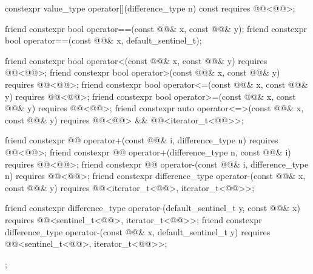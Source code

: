 \begin{codeblock}
{{    constexpr value_type operator[](difference_type n) const
      requires @@<@@>;

    friend constexpr bool operator==(const @@& x, const @@& y);
    friend constexpr bool operator==(const @@& x, default_sentinel_t);

    friend constexpr bool operator<(const @@& x, const @@& y)
      requires @@<@@>;
    friend constexpr bool operator>(const @@& x, const @@& y)
      requires @@<@@>;
    friend constexpr bool operator<=(const @@& x, const @@& y)
      requires @@<@@>;
    friend constexpr bool operator>=(const @@& x, const @@& y)
      requires @@<@@>;
    friend constexpr auto operator<=>(const @@& x, const @@& y)
      requires @@<@@> &&
               @@<iterator_t<@@>>;

    friend constexpr @@ operator+(const @@& i, difference_type n)
      requires @@<@@>;
    friend constexpr @@ operator+(difference_type n, const @@& i)
      requires @@<@@>;
    friend constexpr @@ operator-(const @@& i, difference_type n)
      requires @@<@@>;
    friend constexpr difference_type operator-(const @@& x, const @@& y)
      requires @@<iterator_t<@@>, iterator_t<@@>>;

    friend constexpr difference_type operator-(default_sentinel_t y, const @@& x)
      requires @@<sentinel_t<@@>, iterator_t<@@>>;
    friend constexpr difference_type operator-(const @@& x, default_sentinel_t y)
      requires @@<sentinel_t<@@>, iterator_t<@@>>;
  };
}
\end{codeblock}

